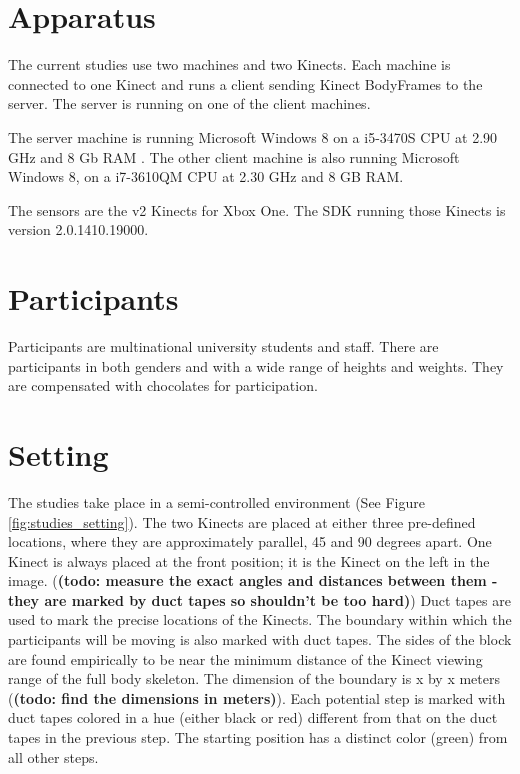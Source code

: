 \section{Apparatus}
\label{sec:studies_apparatus}

The current studies use two machines and two Kinects. Each machine is connected to one Kinect and runs a client sending Kinect BodyFrames to the server. The server is running on one of the client machines.

The server machine is running Microsoft Windows 8 on a i5-3470S CPU at 2.90 GHz and 8 Gb RAM . The other client machine is also running Microsoft Windows 8, on a i7-3610QM CPU at 2.30 GHz and 8 GB RAM.

The sensors are the v2 Kinects for Xbox One. The SDK running those Kinects is version 2.0.1410.19000.

\section{Participants}
\label{sec:studies_participants}

Participants are multinational university students and staff. There are participants in both genders and with a wide range of heights and weights. They are compensated with chocolates for participation.

\section{Setting}
\label{sec:studies_settings}

The studies take place in a semi-controlled environment (See Figure \ref{fig:studies_setting}). The two Kinects are placed at either three pre-defined locations, where they are approximately parallel, 45 and 90 degrees apart. One Kinect is always placed at the front position; it is the Kinect on the left in the image. (\textbf{(todo: measure the exact angles and distances between them - they are marked by duct tapes so shouldn't be too hard)}) Duct tapes are used to mark the precise locations of the Kinects. The boundary within which the participants will be moving is also marked with duct tapes. The sides of the block are found empirically to be near the minimum distance of the Kinect viewing range of the full body skeleton. The dimension of the boundary is x by x meters (\textbf{(todo: find the dimensions in meters)}). Each potential step is marked with duct tapes colored in a hue (either black or red) different from that on the duct tapes in the previous step. The starting position has a distinct color (green) from all other steps.

